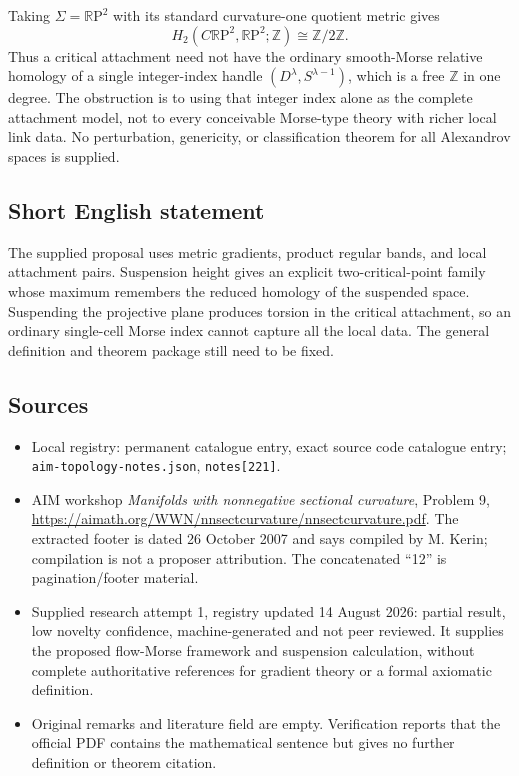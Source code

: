 \documentclass[11pt]{article}
\newcommand{\Z}{\mathbb{Z}}
\newcommand{\R}{\mathbb{R}}
\begin{document}
Taking $\Sigma=\R\mathrm P^2$ with its standard curvature-one quotient metric gives
\[
H_2(C\R\mathrm P^2,\R\mathrm P^2;\Z)\cong\Z/2\Z.
\]
Thus a critical attachment need not have the ordinary smooth-Morse relative homology of a single integer-index handle $(D^\lambda,S^{\lambda-1})$, which is a free $\Z$ in one degree. The obstruction is to using that integer index alone as the complete attachment model, not to every conceivable Morse-type theory with richer local link data. No perturbation, genericity, or classification theorem for all Alexandrov spaces is supplied.
\subsection{Short English statement}
The supplied proposal uses metric gradients, product regular bands, and local attachment pairs. Suspension height gives an explicit two-critical-point family whose maximum remembers the reduced homology of the suspended space. Suspending the projective plane produces torsion in the critical attachment, so an ordinary single-cell Morse index cannot capture all the local data. The general definition and theorem package still need to be fixed.
\subsection{Sources}
\begin{itemize}
\item Local registry: permanent catalogue entry, exact source code catalogue entry; \texttt{aim-topology-notes.json}, \texttt{notes[221]}.
\item AIM workshop \emph{Manifolds with nonnegative sectional curvature}, Problem 9, \url{https://aimath.org/WWN/nnsectcurvature/nnsectcurvature.pdf}. The extracted footer is dated 26 October 2007 and says compiled by M. Kerin; compilation is not a proposer attribution. The concatenated ``12'' is pagination/footer material.
\item Supplied research attempt 1, registry updated 14 August 2026: partial result, low novelty confidence, machine-generated and not peer reviewed. It supplies the proposed flow-Morse framework and suspension calculation, without complete authoritative references for gradient theory or a formal axiomatic definition.
\item Original remarks and literature field are empty. Verification reports that the official PDF contains the mathematical sentence but gives no further definition or theorem citation.
\end{itemize}
\end{document}
